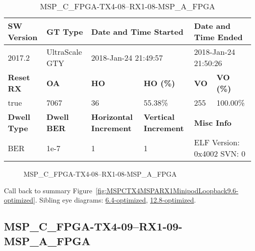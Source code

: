 \begin{table}[h]
\centering
\caption{MSP\_C\_FPGA-TX4-08--RX1-08-MSP\_A\_FPGA}
\label{tab:MSPCFPGATX408RX108MSPAFPGA9.6-optimized}
\begin{tabular}{@{}|l|l|l|l|l|l|@{}}
\toprule
\textbf{SW Version}                & \textbf{GT Type}   & \multicolumn{2}{l|}{\textbf{Date and Time Started}}            & \multicolumn{2}{l|}{\textbf{Date and Time Ended}}        \\ \midrule
2017.2                       & UltraScale GTY          & \multicolumn{2}{l|}{2018-Jan-24 21:49:57}                   & \multicolumn{2}{l|}{2018-Jan-24 21:50:26}               \\ \midrule
\textbf{Reset RX}                  & \textbf{OA} & \textbf{HO}   & \textbf{HO (\%)} & \textbf{VO} & \textbf{VO (\%)} \\ \midrule
true & 7067        & 36          & 55.38\%        & 255        & 100.00\%       \\ \midrule
\textbf{Dwell Type}                & \textbf{Dwell BER} & \textbf{Horizontal Increment} & \textbf{Vertical Increment}    & \multicolumn{2}{l|}{\textbf{Misc Info}}                  \\ \midrule
BER                            & 1e-7        & 1        & 1           & \multicolumn{2}{l|}{ELF Version: 0x4002 SVN: 0}                         \\ \bottomrule
\end{tabular}
\end{table}

\begin{figure}[h]
\caption{MSP\_C\_FPGA-TX4-08--RX1-08-MSP\_A\_FPGA} \label{fig:MSPCFPGATX408RX108MSPAFPGA9.6-optimized}
\end{figure}

Call back to summary Figure~\ref{fig:MSPCTX4MSPARX1MinipodLoopback9.6-optimized}.
Sibling eye diagrams: \hyperref[sec:MSPCFPGATX408RX108MSPAFPGA6.4-optimized]{6.4-optimized}, \hyperref[sec:MSPCFPGATX408RX108MSPAFPGA12.8-optimized]{12.8-optimized}.

\clearpage
\newpage


\subsection{MSP\_C\_FPGA-TX4-09--RX1-09-MSP\_A\_FPGA}\label{sec:MSPCFPGATX409RX109MSPAFPGA9.6-optimized}


